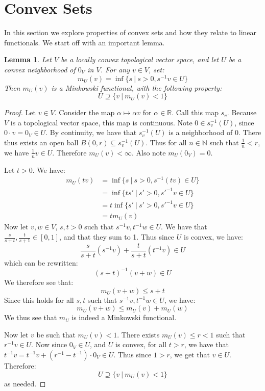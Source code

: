 \documentclass[a4paper,12pt]{report}
\newcommand{\sse} {\subseteq}
\newtheorem{lemma}[theorem]{Lemma}
\begin{document}
	\section{Convex Sets}
	
	In this section we explore properties of convex sets and how they relate to linear functionals. We start off with an important lemma.
	
	\begin{lemma}
	Let $V$ be a locally convex topological vector space, and let $U$ be a convex neighborhood of $0_V$ in $V$. For any $v \in V$, set:
	\[ m_U(v) = \inf \big\{ s ~|~ s > 0, s^{-1}v \in U \big\} \]
	Then $m_U(v)$ is a Minkowski functional, with the following property:
	\[ U \supseteq \{v ~|~ m_U(v) < 1 \} \]
	\end{lemma}
	\begin{proof}
	Let $v \in V$. Consider the map $\alpha \mapsto \alpha v$ for $\alpha \in \mathbb{R}$. Call this map $s_v$. Because $V$ is a topological vector space, this map is continuous. Note $0 \in s_v^{-1}(U)$, since $0 \cdot v = 0_V \in U$. By continuity, we have that $s_v^{-1}(U)$ is a neighborhood of 0. There thus exists an open ball $B(0, r) \sse s_v^{-1}(U)$. Thus for all $n \in \mathbb{N}$ such that $\frac{1}{n} < r$, we have $\frac{1}{n}v \in U$. Therefore $m_U(v) < \infty$. Also note $m_U(0_V) = 0$.
	
	Let $t > 0$. We have:
	\begin{align*}
	m_U(tv) &= \inf \big\{ s ~|~ s > 0, s^{-1}(tv) \in U \big\} \\
	&= \inf \big\{ ts' ~|~ s' > 0, s'^{-1}v \in U \big\} \\
	&= t \inf \big\{ s' ~|~ s' > 0, s'^{-1}v \in U \big\} \\
	&= tm_U(v) 
	\end{align*}
	Now let $v, w \in V$, $s, t > 0$ such that $s^{-1}v, t^{-1}w \in U$. We have that $\frac{s}{s+t}, \frac{t}{s+1} \in [0, 1]$, and that they sum to 1. Thus since $U$ is convex, we have:
	\[ \frac{s}{s+t}(s^{-1}v) + \frac{t}{s+t}(t^{-1}v) \in U \]
	which can be rewritten:
	\[ (s + t)^{-1}(v + w) \in U \]
	We therefore see that:
	\[ m_U(v + w) \leq s + t \]
	Since this holds for all $s, t$ such that $s^{-1}v, t^{-1}w \in U$, we have:
	\[ m_U(v + w) \leq m_U(v) + m_U(w) \]
	We thus see that $m_U$ is indeed a Minkowski functional. 
	
	Now let $v$ be such that $m_U(v) < 1$. There exists $m_U(v) \leq r  < 1$ such that $r^{-1}v \in U$. Now since $0_V \in U$, and $U$ is convex, for all $t > r$, we have that $t^{-1}v = t^{-1}v + (r^{-1} - t^{-1})\cdot 0_V \in U$. Thus since $1 > r$, we get that $v \in U$. Therefore:
	\[ U \supseteq \{v ~|~ m_U(v) < 1 \} \]
	as needed.
	\end{proof}
	
\end{document}
